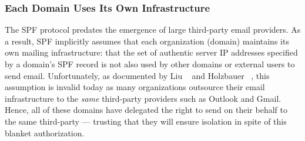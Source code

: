 %
%


\subsubsection{Each Domain Uses Its Own Infrastructure}
\label{subsubsec:spf_incorporation}
The SPF protocol predates the emergence of large third-party email providers.
As a result, SPF implicitly assumes that each organization (domain) maintains its own mailing infrastructure: that the set of authentic server IP addresses specified by a domain's SPF record is not also used by other domains or external users to send email.
Unfortunately, as documented by Liu \etal~\cite{liu2021s} and Holzbauer \etal~\cite{holzbauer2022not}, this assumption is invalid today as many organizations outsource their email infrastructure to the \emph{same} third-party providers such as Outlook and Gmail.  Hence, all of these domains have delegated the right to send on their behalf to the same third-party --- trusting that they will ensure isolation in spite of this blanket authorization.


